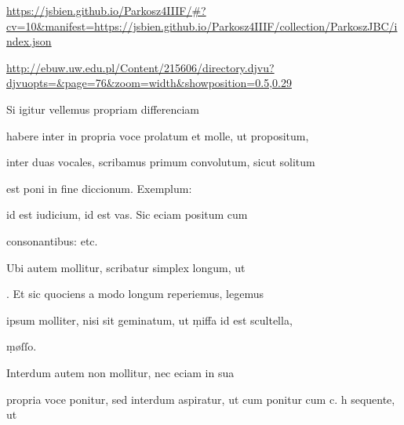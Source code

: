 
\newParkoszpage

{
  \url{https://jsbien.github.io/Parkosz4IIIF/\#?cv=10&manifest=https://jsbien.github.io/Parkosz4IIIF/collection/ParkoszJBC/index.json}

\url{http://ebuw.uw.edu.pl/Content/215606/directory.djvu?djvuopts=&page=76&zoom=width&showposition=0.5,0.29}
}

\bigskip

\obeylines
\mono



\fullpreviouslines


{
\color{blue}



\indentK Si igitur vellemus propriam differenciam

\fulllines

habere inter  in propria voce prolatum et  molle, ut propositum,
}


\fulllines

inter duas vocales, scribamus primum convolutum, sicut solitum

est poni in fine diccionum. Exemplum:   

 id est iudicium,  id est vas. Sic eciam positum cum

consonantibus:      etc.

Ubi autem mollitur, scribatur simplex longum, ut 

. Et sic quociens a modo  longum reperiemus, legemus

ipsum molliter, nisi sit geminatum, ut ṃiffa id est scultella,

\splitlines

ṃøſſo.

\indentK Interdum autem  non mollitur, nec eciam in sua

\fulllines

propria voce ponitur, sed interdum aspiratur, ut cum ponitur cum
 c. h sequente, ut   


